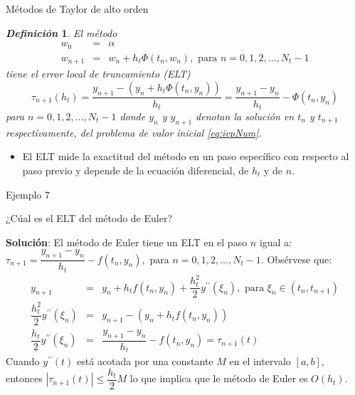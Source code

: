 \documentclass{beamer}
\newtheorem{defi}{\textit{\textbf{Definici\'on}}}
\begin{document}
\begin{frame}{Métodos de Taylor de alto orden}

{\small 
\begin{defi}
	El método
\begin{eqnarray}
w_0 & = & \alpha  \nonumber\\
w_{n+1} & = & w_n + h_t \Phi(t_n, w_n), \text{ para } n = 0, 1,2, \dots , N_t-1 \nonumber
\end{eqnarray}	
tiene el error local de truncamiento (ELT) 
\begin{displaymath}
\tau_{n+1}(h_t) = \dfrac{y_{n+1} - (y_n + h_t \Phi(t_n, y_n))}{h_t} = \dfrac{y_{n+1} - y_n}{h_t} - \Phi(t_n, y_n)
\end{displaymath}
para $n = 0, 1,2, \dots , N_t -1$ donde $y_n$ y $y_{n+1}$ denotan la solución en $t_n$ y $t_{n+1}$ respectivamente, del problema de valor inicial \eqref{eq:ivpNum}.
\end{defi}

\begin{itemize}
\item El ELT  mide la exactitud del método en un paso específico con respecto al paso previo y depende de la ecuación diferencial, de $h_t$ y de $n$. 
\end{itemize}
}

\end{frame}

\begin{frame}{Ejemplo 7}

\begin{block}{}
¿Cúal es el ELT del método de Euler?
\end{block}
{\small
\textbf{Solución}: El método de Euler tiene un ELT en el paso $n$ igual a:
$ \tau_{n+1} = \dfrac{y_{n+1} - y_n}{h_t} - f(t_n, y_n), \text{ para } n = 0, 1,2, \dots , N_t-1$.
Obsérvese que:
\begin{eqnarray*}
y_{n+1} & = & y_n + h_t f(t_n, y_n) + \dfrac{h_t^2}{2} y^{\prime\prime} (\xi_n), \text{ para } \xi_n \in (t_n, t_{n+1}) \\
\dfrac{h_t^2}{2} y^{\prime\prime} (\xi_n) & = & y_{n+1} - (y_n + h_t f(t_n, y_n))  \\
\dfrac{h_t}{2} y^{\prime\prime} (\xi_n)  & = &\dfrac{y_{n+1} - y_n}{h_t} - f(t_n, y_n) = \tau_{n+1}(t)
\end{eqnarray*}
Cuando $y^{\prime\prime}(t)$ está acotada por una constante $M$ en el intervalo $[a,b]$, entonces $|\tau_{n+1}(t)| \leq \dfrac{h_t}{2} M$ lo que implica que le método de Euler es $O (h_t)$.
}
\end{frame}
\end{document}
